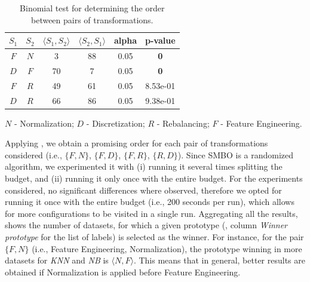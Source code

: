 \begin{example}
\begin{table}[t]
	\centering
	\footnotesize
	\begin{threeparttable}
		\caption{
			Binomial test for determining the order between pairs of transformations. 
		}
		\label{tbl:significance-test}
		\begin{tabular}{@{}cccccc@{}}
			\toprule
			$S_1$ & $S_2$ & $\langle S_1, S_2 \rangle$ & $\langle S_2, S_1 \rangle$ & alpha & p-value\\ \midrule
			$F$ & $N$ & 3 & 88 & 0.05 &  \textbf{0} \\
			$D$ & $F$ & 70 & 7 & 0.05 &  \textbf{0}  \\
			$F$ & $R$ & 49 & 61 & 0.05 & 8.53e-01 \\
			$D$ & $R$ & 66 & 86 & 0.05 & 9.38e-01 \\ \bottomrule
		\end{tabular}
		\begin{tablenotes}
		\centering
		\scriptsize
		\item$N$ - Normalization; $D$ - Discretization; $R$ - Rebalancing; $F$ - Feature Engineering. 
		\end{tablenotes}
	\end{threeparttable}
\end{table}
Applying , we obtain a promising order for each pair of transformations considered (i.e., $\{F,N\}$, $\{F,D\}$, $\{F,R\}$, $\{R,D\}$).
Since SMBO is a randomized algorithm, we experimented it with (i) running it several times splitting the budget, and (ii) running it only once with the entire budget.
For the experiments considered, no significant differences where observed, therefore we opted for running it once with the entire budget (i.e., 200 seconds per run), which allows for more configurations to be visited in a single run. Aggregating all the results,  shows the number of datasets, for which a given prototype (, column \textit{Winner prototype} for the list of labels) is selected as the winner.
For instance, for the pair $\{F,N\}$ (i.e., Feature Engineering, Normalization), the prototype winning in more datasets for \textit{KNN} and \textit{NB} is $\langle N, F \rangle$.
This means that in general, better results are obtained if Normalization is applied before Feature Engineering.


\end{example}
